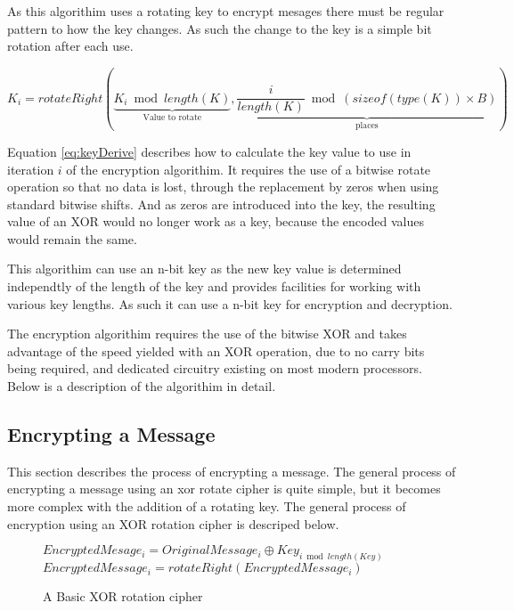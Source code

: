 \documentclass[12pt]{article}
\begin{document}
  As this algorithim uses a rotating key to encrypt mesages there
  must be regular pattern to how the key changes. As such the
  change to the key is a simple bit rotation after each use. 

  \begin{equation}
    \label{eq:keyDerive}
    K_i = rotateRight(
        \underbrace{K_i \bmod length(K)}_\text{Value to rotate},
        \underbrace{\frac{i}{length(K)} \bmod (sizeof(type(K)) 
            \times B)}_\text{places}) 
  \end{equation}

  Equation \eqref{eq:keyDerive} describes how to calculate the key 
  value to use in iteration \( i \) of the encryption algorithim. 
  It requires the use of a bitwise rotate operation so that no data 
  is lost, through the replacement by zeros when using standard 
  bitwise shifts. And as zeros are introduced into the key, the 
  resulting value of an XOR would no longer work as a key, because
  the encoded values would remain the same.

  This algorithim can use an n-bit key as the new key value is
  determined independtly of the length of the key and provides
  facilities for working with various key lengths. As such it can use
  a n-bit key for encryption and decryption.

  The encryption algorithim requires the use of the bitwise XOR and
  takes advantage of the speed yielded with an XOR operation, due to
  no carry bits being required, and dedicated circuitry existing on most
  modern processors. Below is a description of the algorithim in detail.

  \subsection{Encrypting a Message}
    This section describes the process of encrypting a message.
    The general process of encrypting a message using an xor rotate
    cipher is quite simple, but it becomes more complex with the
    addition of a rotating key. The general process of encryption
    using an XOR rotation cipher is descriped below. 
    
    \begin{figure}[h]
    \begin{algorithmic}[1]
      \State $EncryptedMesage_i =
             OriginalMessage_i \oplus Key_{i \bmod length(Key)}$
      \State $EncryptedMessage_i = rotateRight(EncryptedMessage_i)$
    \EndFor 
    \end{algorithmic}
    \caption{A Basic XOR rotation cipher}
    \end{figure}
\end{document}
